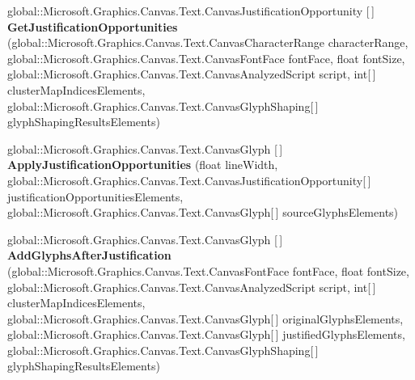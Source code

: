 \begin{DoxyCompactItemize}
\item 
\mbox{\label{interface_microsoft_1_1_graphics_1_1_canvas_1_1_text_1_1_i_canvas_text_analyzer_a8b4e8e82cde2cb867edd74bb7ed467e5}} 
global\+::\+Microsoft.\+Graphics.\+Canvas.\+Text.\+Canvas\+Justification\+Opportunity \mbox{[}$\,$\mbox{]} {\bfseries Get\+Justification\+Opportunities} (global\+::\+Microsoft.\+Graphics.\+Canvas.\+Text.\+Canvas\+Character\+Range character\+Range, global\+::\+Microsoft.\+Graphics.\+Canvas.\+Text.\+Canvas\+Font\+Face font\+Face, float font\+Size, global\+::\+Microsoft.\+Graphics.\+Canvas.\+Text.\+Canvas\+Analyzed\+Script script, int\mbox{[}$\,$\mbox{]} cluster\+Map\+Indices\+Elements, global\+::\+Microsoft.\+Graphics.\+Canvas.\+Text.\+Canvas\+Glyph\+Shaping\mbox{[}$\,$\mbox{]} glyph\+Shaping\+Results\+Elements)
\item 
\mbox{\label{interface_microsoft_1_1_graphics_1_1_canvas_1_1_text_1_1_i_canvas_text_analyzer_a591e2b96c883de04bb901715834d4f5a}} 
global\+::\+Microsoft.\+Graphics.\+Canvas.\+Text.\+Canvas\+Glyph \mbox{[}$\,$\mbox{]} {\bfseries Apply\+Justification\+Opportunities} (float line\+Width, global\+::\+Microsoft.\+Graphics.\+Canvas.\+Text.\+Canvas\+Justification\+Opportunity\mbox{[}$\,$\mbox{]} justification\+Opportunities\+Elements, global\+::\+Microsoft.\+Graphics.\+Canvas.\+Text.\+Canvas\+Glyph\mbox{[}$\,$\mbox{]} source\+Glyphs\+Elements)
\item 
\mbox{\label{interface_microsoft_1_1_graphics_1_1_canvas_1_1_text_1_1_i_canvas_text_analyzer_a2273cc0297471b8040a1ceb61d9fc6ba}} 
global\+::\+Microsoft.\+Graphics.\+Canvas.\+Text.\+Canvas\+Glyph \mbox{[}$\,$\mbox{]} {\bfseries Add\+Glyphs\+After\+Justification} (global\+::\+Microsoft.\+Graphics.\+Canvas.\+Text.\+Canvas\+Font\+Face font\+Face, float font\+Size, global\+::\+Microsoft.\+Graphics.\+Canvas.\+Text.\+Canvas\+Analyzed\+Script script, int\mbox{[}$\,$\mbox{]} cluster\+Map\+Indices\+Elements, global\+::\+Microsoft.\+Graphics.\+Canvas.\+Text.\+Canvas\+Glyph\mbox{[}$\,$\mbox{]} original\+Glyphs\+Elements, global\+::\+Microsoft.\+Graphics.\+Canvas.\+Text.\+Canvas\+Glyph\mbox{[}$\,$\mbox{]} justified\+Glyphs\+Elements, global\+::\+Microsoft.\+Graphics.\+Canvas.\+Text.\+Canvas\+Glyph\+Shaping\mbox{[}$\,$\mbox{]} glyph\+Shaping\+Results\+Elements)

\end{DoxyCompactItemize}
